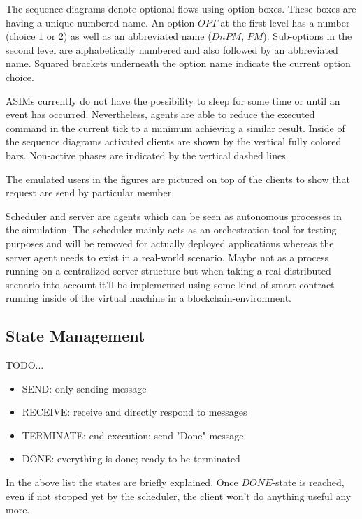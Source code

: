 The sequence diagrams denote optional flows using option boxes. These boxes are having a unique numbered name. An option $OPT$ at the first level has a number (choice $1$ or $2$) as well as an abbreviated name ($DnPM$, $PM$). Sub-options in the second level are alphabetically numbered and also followed by an abbreviated name. Squared brackets underneath the option name indicate the current option choice.

ASIMs currently do not have the possibility to sleep for some time or until an event has occurred. Nevertheless, agents are able to reduce the executed command in the current tick to a minimum achieving a similar result. Inside of the sequence diagrams activated clients are shown by the vertical fully colored bars. Non-active phases are indicated by the vertical dashed lines.

The emulated users in the figures are pictured on top of the clients to show that request are send by particular member.

Scheduler and server are agents which can be seen as autonomous processes in the simulation. The scheduler mainly acts as an orchestration tool for testing purposes and will be removed for actually deployed applications whereas the server agent needs to exist in a real-world scenario. Maybe not as a process running on a centralized server structure but when taking a real distributed scenario into account it'll be implemented using some kind of smart contract running inside of the virtual machine in a blockchain-environment.

\subsection{State Management}
\label{subsec:impl-states}

TODO...

\begin{itemize}
	\item SEND: only sending message
	\item RECEIVE: receive and directly respond to messages
	\item TERMINATE: end execution; send "Done" message
	\item DONE: everything is done; ready to be terminated
\end{itemize}

In the above list the states are briefly explained. Once $DONE$-state is reached, even if not stopped yet by the scheduler, the client won't do anything useful any more.

